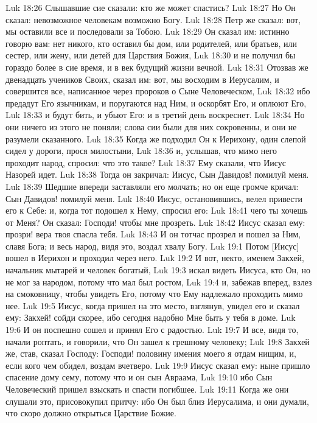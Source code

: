 Luk 18:26  Слышавшие сие сказали: кто же может спастись?
Luk 18:27  Но Он сказал: невозможное человекам возможно Богу.
Luk 18:28  Петр же сказал: вот, мы оставили все и последовали за Тобою.
Luk 18:29  Он сказал им: истинно говорю вам: нет никого, кто оставил бы дом, или родителей, или братьев, или сестер, или жену, или детей для Царствия Божия,
Luk 18:30  и не получил бы гораздо более в сие время, и в век будущий жизни вечной.
Luk 18:31  Отозвав же двенадцать учеников Своих, сказал им: вот, мы восходим в Иерусалим, и совершится все, написанное через пророков о Сыне Человеческом,
Luk 18:32  ибо предадут Его язычникам, и поругаются над Ним, и оскорбят Его, и оплюют Его,
Luk 18:33  и будут бить, и убьют Его: и в третий день воскреснет.
Luk 18:34  Но они ничего из этого не поняли; слова сии были для них сокровенны, и они не разумели сказанного.
Luk 18:35  Когда же подходил Он к Иерихону, один слепой сидел у дороги, прося милостыни,
Luk 18:36  и, услышав, что мимо него проходит народ, спросил: что это такое?
Luk 18:37  Ему сказали, что Иисус Назорей идет.
Luk 18:38  Тогда он закричал: Иисус, Сын Давидов! помилуй меня.
Luk 18:39  Шедшие впереди заставляли его молчать; но он еще громче кричал: Сын Давидов! помилуй меня.
Luk 18:40  Иисус, остановившись, велел привести его к Себе: и, когда тот подошел к Нему, спросил его:
Luk 18:41  чего ты хочешь от Меня? Он сказал: Господи! чтобы мне прозреть.
Luk 18:42  Иисус сказал ему: прозри! вера твоя спасла тебя.
Luk 18:43  И он тотчас прозрел и пошел за Ним, славя Бога; и весь народ, видя это, воздал хвалу Богу.
Luk 19:1  Потом [Иисус] вошел в Иерихон и проходил через него.
Luk 19:2  И вот, некто, именем Закхей, начальник мытарей и человек богатый,
Luk 19:3  искал видеть Иисуса, кто Он, но не мог за народом, потому что мал был ростом,
Luk 19:4  и, забежав вперед, взлез на смоковницу, чтобы увидеть Его, потому что Ему надлежало проходить мимо нее.
Luk 19:5  Иисус, когда пришел на это место, взглянув, увидел его и сказал ему: Закхей! сойди скорее, ибо сегодня надобно Мне быть у тебя в доме.
Luk 19:6  И он поспешно сошел и принял Его с радостью.
Luk 19:7  И все, видя то, начали роптать, и говорили, что Он зашел к грешному человеку;
Luk 19:8  Закхей же, став, сказал Господу: Господи! половину имения моего я отдам нищим, и, если кого чем обидел, воздам вчетверо.
Luk 19:9  Иисус сказал ему: ныне пришло спасение дому сему, потому что и он сын Авраама,
Luk 19:10  ибо Сын Человеческий пришел взыскать и спасти погибшее.
Luk 19:11  Когда же они слушали это, присовокупил притчу: ибо Он был близ Иерусалима, и они думали, что скоро должно открыться Царствие Божие.
